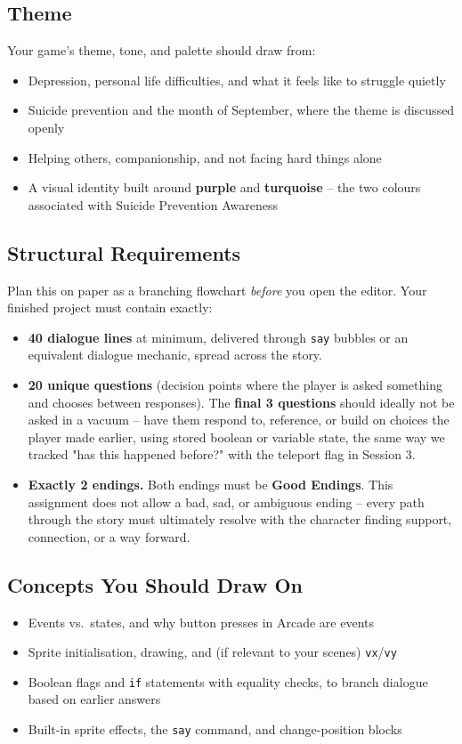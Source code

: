 \documentclass[11pt]{article}
\begin{document}
\subsection{Theme}
Your game's theme, tone, and palette should draw from:
\begin{itemize}
\item Depression, personal life difficulties, and what it feels like to struggle quietly
\item Suicide prevention and the month of September, where the theme is discussed openly
\item Helping others, companionship, and not facing hard things alone
\item A visual identity built around \textbf{purple} and \textbf{turquoise} -- the two
colours associated with Suicide Prevention Awareness
\end{itemize}

\subsection{Structural Requirements}
Plan this on paper as a branching flowchart \emph{before} you open the editor. Your
finished project must contain exactly:
\begin{itemize}
\item \textbf{40 dialogue lines} at minimum, delivered through \texttt{say} bubbles or
an equivalent dialogue mechanic, spread across the story.
\item \textbf{20 unique questions} (decision points where the player is asked
something and chooses between responses). The \textbf{final 3 questions} should
ideally not be asked in a vacuum -- have them respond to, reference, or build on
choices the player made earlier, using stored boolean or variable state, the same way
we tracked "has this happened before?" with the teleport flag in Session 3.
\item \textbf{Exactly 2 endings.} Both endings must be \textbf{Good Endings}. This
assignment does not allow a bad, sad, or ambiguous ending -- every path through the
story must ultimately resolve with the character finding support, connection, or a
way forward.
\end{itemize}

\subsection{Concepts You Should Draw On}
\begin{itemize}
\item Events vs.\ states, and why button presses in Arcade are events
\item Sprite initialisation, drawing, and (if relevant to your scenes) \texttt{vx}/\texttt{vy}
\item Boolean flags and \texttt{if} statements with equality checks, to branch dialogue
based on earlier answers
\item Built-in sprite effects, the \texttt{say} command, and change-position blocks
\end{itemize}
\end{document}

